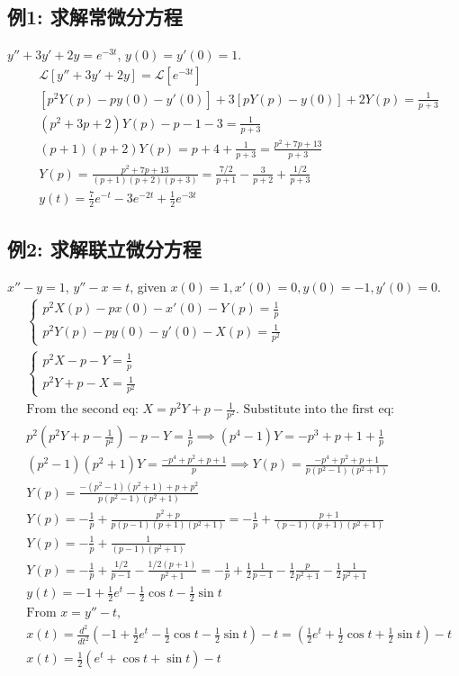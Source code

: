 \documentclass{article}
\begin{document}
	\subsection*{例1: 求解常微分方程}
	$y''+3y'+2y = e^{-3t}$, $y(0)=y'(0)=1$.
	\begin{align*}
		& \mathcal{L}[y''+3y'+2y] = \mathcal{L}[e^{-3t}] \\
		& [p^2 Y(p) - py(0) - y'(0)] + 3[pY(p) - y(0)] + 2Y(p) = \frac{1}{p+3} \\
		& (p^2+3p+2)Y(p) - p - 1 - 3 = \frac{1}{p+3} \\
		& (p+1)(p+2)Y(p) = p+4 + \frac{1}{p+3} = \frac{p^2+7p+13}{p+3} \\
		& Y(p) = \frac{p^2+7p+13}{(p+1)(p+2)(p+3)} = \frac{7/2}{p+1} - \frac{3}{p+2} + \frac{1/2}{p+3} \\
		& y(t) = \frac{7}{2}e^{-t} - 3e^{-2t} + \frac{1}{2}e^{-3t}
	\end{align*}
	
	\subsection*{例2: 求解联立微分方程}
	$x'' - y = 1$, $y'' - x = t$, given $x(0)=1, x'(0)=0, y(0)=-1, y'(0)=0$.
	\begin{align*}
		& \begin{cases} p^2X(p) - px(0) - x'(0) - Y(p) = \frac{1}{p} \\ p^2Y(p) - py(0) - y'(0) - X(p) = \frac{1}{p^2} \end{cases} \\
		& \begin{cases} p^2X - p - Y = \frac{1}{p} \\ p^2Y + p - X = \frac{1}{p^2} \end{cases} \\
		& \text{From the second eq: } X = p^2Y + p - \frac{1}{p^2}. \text{ Substitute into the first eq:} \\
		& p^2(p^2Y+p-\frac{1}{p^2}) - p - Y = \frac{1}{p} \implies (p^4-1)Y = -p^3+p+1+\frac{1}{p} \\
		& (p^2-1)(p^2+1)Y = \frac{-p^4+p^2+p+1}{p} \implies Y(p) = \frac{-p^4+p^2+p+1}{p(p^2-1)(p^2+1)} \\
		& Y(p) = \frac{-(p^2-1)(p^2+1)+p+p^2}{p(p^2-1)(p^2+1)} \\
		& Y(p) = -\frac{1}{p} + \frac{p^2+p}{p(p-1)(p+1)(p^2+1)} = -\frac{1}{p} + \frac{p+1}{(p-1)(p+1)(p^2+1)} \\
		& Y(p) = -\frac{1}{p} + \frac{1}{(p-1)(p^2+1)} \\
		& Y(p) = -\frac{1}{p} + \frac{1/2}{p-1} - \frac{1/2(p+1)}{p^2+1} = -\frac{1}{p} + \frac{1}{2}\frac{1}{p-1} - \frac{1}{2}\frac{p}{p^2+1} - \frac{1}{2}\frac{1}{p^2+1} \\
		& y(t) = -1 + \frac{1}{2}e^t - \frac{1}{2}\cos t - \frac{1}{2}\sin t \\
		& \text{From } x=y''-t, \\
		& x(t) = \frac{d^2}{dt^2}(-1 + \frac{1}{2}e^t - \frac{1}{2}\cos t - \frac{1}{2}\sin t) - t = (\frac{1}{2}e^t + \frac{1}{2}\cos t + \frac{1}{2}\sin t) - t \\
		& x(t) = \frac{1}{2}(e^t + \cos t + \sin t) - t
	\end{align*}
	
\end{document}

